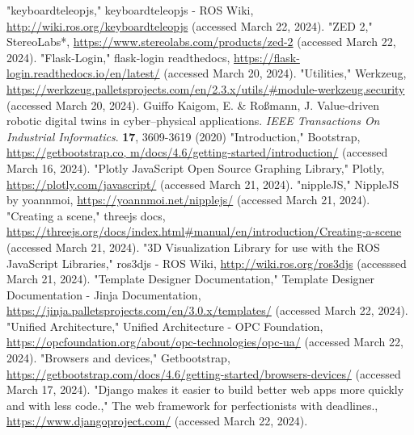 \documentclass[conference]{IEEEtran}
\begin{document}
\begin{thebibliography}{00}
"keyboardteleopjs," keyboardteleopjs - ROS Wiki, \url{http://wiki.ros.org/keyboardteleopjs} (accessed March 22, 2024).
"ZED 2," StereoLabs*, \url{https://www.stereolabs.com/products/zed-2} (accessed March 22, 2024).
"Flask-Login," flask-login readthedocs, \url{https://flask-login.readthedocs.io/en/latest/} (accessed March 20, 2024).
"Utilities," Werkzeug, \url{https://werkzeug.palletsprojects.com/en/2.3.x/utils/#module-werkzeug.security} (accessed March 20, 2024).
Guiffo Kaigom, E. \& Roßmann, J. Value-driven robotic digital twins in cyber–physical applications. {\em IEEE Transactions On Industrial Informatics}. \textbf{17}, 3609-3619 (2020)
"Introduction," Bootstrap, \url{https://getbootstrap.co, m/docs/4.6/getting-started/introduction/} (accessed March 16, 2024).
"Plotly JavaScript Open Source Graphing Library," Plotly, \url{https://plotly.com/javascript/} (accessed March 21, 2024).
"nippleJS," NippleJS by yoannmoi, \url{https://yoannmoi.net/nipplejs/} (accessed March 21, 2024).
"Creating a scene," threejs docs, \url{https://threejs.org/docs/index.html#manual/en/introduction/Creating-a-scene} (accessed March 21, 2024).
"3D Visualization Library for use with the ROS JavaScript Libraries," ros3djs - ROS Wiki, \url{http://wiki.ros.org/ros3djs} (accesssed March 21, 2024).
"Template Designer Documentation," Template Designer Documentation - Jinja Documentation, \url{https://jinja.palletsprojects.com/en/3.0.x/templates/} (accessed March 22, 2024).
"Unified Architecture," Unified Architecture - OPC Foundation, \url{https://opcfoundation.org/about/opc-technologies/opc-ua/} (accessed March 22, 2024).
"Browsers and devices," Getbootstrap, \url{https://getbootstrap.com/docs/4.6/getting-started/browsers-devices/} (accessed March 17, 2024).
"Django makes it easier to build better web apps more quickly and with less code.," The web framework for perfectionists with deadlines., \url{https://www.djangoproject.com/} (accessed March 22, 2024).
\end{thebibliography}
\vspace{12pt}
\end{document}
